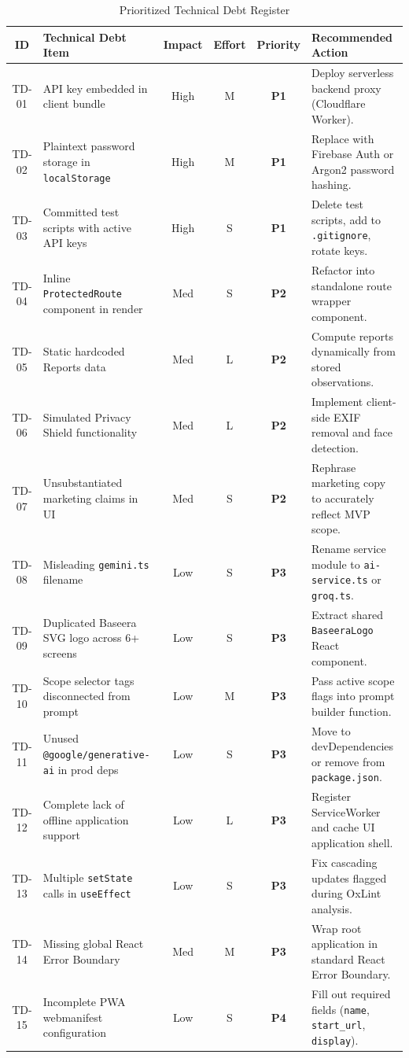 \documentclass[10pt,a4paper]{report}
\newcommand{\badgePone}{\colorbox{red!20}{\textcolor{critRed}{\bfseries\scriptsize P1}}}
\newcommand{\badgePtwo}{\colorbox{orange!20}{\textcolor{critRed!80!orange}{\bfseries\scriptsize P2}}}
\newcommand{\badgePthree}{\colorbox{yellow!30}{\textcolor{warnOrange!80!black}{\bfseries\scriptsize P3}}}
\newcommand{\badgePfour}{\colorbox{green!15}{\textcolor{passGreen}{\bfseries\scriptsize P4}}}
\begin{document}
\begin{table}[htbp]
\centering
\scriptsize
\caption{Prioritized Technical Debt Register}
\begin{tabularx}{\textwidth}{c l c c c X}
\toprule
\textbf{ID} & \textbf{Technical Debt Item} & \textbf{Impact} & \textbf{Effort} & \textbf{Priority} & \textbf{Recommended Action} \\
\midrule
TD-01 & API key embedded in client bundle & High & M & \badgePone & Deploy serverless backend proxy (Cloudflare Worker). \\
TD-02 & Plaintext password storage in \texttt{localStorage} & High & M & \badgePone & Replace with Firebase Auth or Argon2 password hashing. \\
TD-03 & Committed test scripts with active API keys & High & S & \badgePone & Delete test scripts, add to \texttt{.gitignore}, rotate keys. \\
TD-04 & Inline \texttt{ProtectedRoute} component in render & Med & S & \badgePtwo & Refactor into standalone route wrapper component. \\
TD-05 & Static hardcoded Reports data & Med & L & \badgePtwo & Compute reports dynamically from stored observations. \\
TD-06 & Simulated Privacy Shield functionality & Med & L & \badgePtwo & Implement client-side EXIF removal and face detection. \\
TD-07 & Unsubstantiated marketing claims in UI & Med & S & \badgePtwo & Rephrase marketing copy to accurately reflect MVP scope. \\
TD-08 & Misleading \texttt{gemini.ts} filename & Low & S & \badgePthree & Rename service module to \texttt{ai-service.ts} or \texttt{groq.ts}. \\
TD-09 & Duplicated Baseera SVG logo across 6+ screens & Low & S & \badgePthree & Extract shared \texttt{BaseeraLogo} React component. \\
TD-10 & Scope selector tags disconnected from prompt & Low & M & \badgePthree & Pass active scope flags into prompt builder function. \\
TD-11 & Unused \texttt{@google/generative-ai} in prod deps & Low & S & \badgePthree & Move to devDependencies or remove from \texttt{package.json}. \\
TD-12 & Complete lack of offline application support & Low & L & \badgePthree & Register ServiceWorker and cache UI application shell. \\
TD-13 & Multiple \texttt{setState} calls in \texttt{useEffect} & Low & S & \badgePthree & Fix cascading updates flagged during OxLint analysis. \\
TD-14 & Missing global React Error Boundary & Med & M & \badgePthree & Wrap root application in standard React Error Boundary. \\
TD-15 & Incomplete PWA webmanifest configuration & Low & S & \badgePfour & Fill out required fields (\texttt{name}, \texttt{start\_url}, \texttt{display}). \\
\bottomrule
\end{tabularx}
\end{table}
\end{document}
